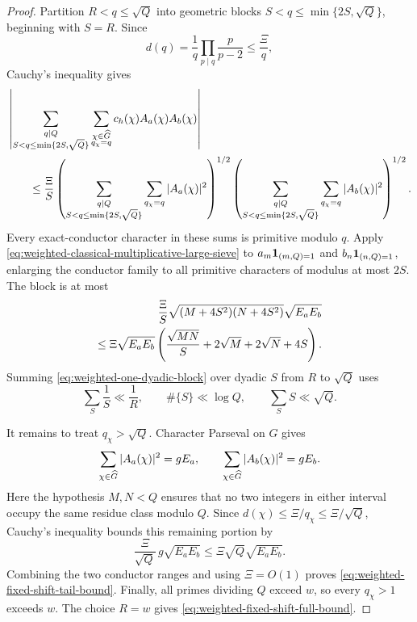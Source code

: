 \begin{proof}
Partition $R<q\leq\sqrt Q$ into geometric blocks
$S<q\leq\min\{2S,\sqrt Q\}$, beginning with $S=R$.  Since
\[
 d(q)=\frac1q\prod_{p\mid q}\frac p{p-2}\leq\frac{\Xi}{q},
\]
Cauchy's inequality gives
\begin{align*}
 &\left|
 \sum_{\substack{q\mid Q\\S<q\leq\min\{2S,\sqrt Q\}}}
 \sum_{\substack{\chi\in\widehat G\\q_\chi=q}}
 c_h(\chi)A_a(\chi)A_b(\chi)
 \right|\\
 &\qquad\leq\frac{\Xi}{S}
 \left(
  \sum_{\substack{q\mid Q\\S<q\leq\min\{2S,\sqrt Q\}}}
  \sum_{q_\chi=q}|A_a(\chi)|^2
 \right)^{1/2}
 \left(
  \sum_{\substack{q\mid Q\\S<q\leq\min\{2S,\sqrt Q\}}}
  \sum_{q_\chi=q}|A_b(\chi)|^2
 \right)^{1/2}.
\end{align*}
Every exact-conductor character in these sums is primitive modulo $q$.
Apply \eqref{eq:weighted-classical-multiplicative-large-sieve} to
$a_m\mathbf 1_{(m,Q)=1}$ and $b_n\mathbf 1_{(n,Q)=1}$, enlarging the conductor family
to all primitive characters of modulus at most $2S$.  The block is at most
\begin{align}
 \frac{\Xi}{S}
 \sqrt{(M+4S^2)(N+4S^2)}\sqrt{E_aE_b}
 \notag\\
 \leq
 \Xi\sqrt{E_aE_b}
 \left(
  \frac{\sqrt{MN}}S+2\sqrt M+2\sqrt N+4S
 \right).
 \label{eq:weighted-one-dyadic-block}
\end{align}
Summing \eqref{eq:weighted-one-dyadic-block} over dyadic $S$ from $R$ to
$\sqrt Q$ uses
\[
 \sum_S\frac1S\ll\frac1R,
 \qquad
 \#\{S\}\ll\log Q,
 \qquad
 \sum_S S\ll\sqrt Q.
\]

It remains to treat $q_\chi>\sqrt Q$.  Character Parseval on $G$ gives
\begin{equation}\label{eq:weighted-ambient-character-parseval}
 \sum_{\chi\in\widehat G}|A_a(\chi)|^2=gE_a,
 \qquad
 \sum_{\chi\in\widehat G}|A_b(\chi)|^2=gE_b.
\end{equation}
Here the hypothesis $M,N<Q$ ensures that no two integers in either interval
occupy the same residue class modulo $Q$.  Since
$d(\chi)\leq\Xi/q_\chi\leq\Xi/\sqrt Q$, Cauchy's inequality bounds this
remaining portion by
\[
 \frac{\Xi}{\sqrt Q}\,g\sqrt{E_aE_b}
 \leq\Xi\sqrt Q\sqrt{E_aE_b}.
\]
Combining the two conductor ranges and using $\Xi=O(1)$ proves
\eqref{eq:weighted-fixed-shift-tail-bound}.  Finally, all primes dividing
$Q$ exceed $w$, so every $q_\chi>1$ exceeds $w$.  The choice $R=w$ gives
\eqref{eq:weighted-fixed-shift-full-bound}.
\end{proof}

